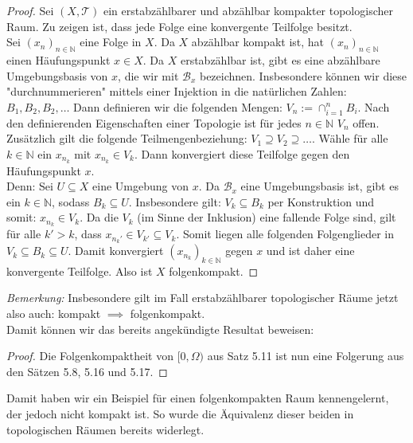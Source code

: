 \documentclass[11pt]{scrartcl}
\begin{document}
\begin{proof}
	Sei $(X,\mathcal T)$ ein erstabzählbarer und abzählbar kompakter topologischer Raum. Zu zeigen ist, dass jede Folge
	eine konvergente Teilfolge besitzt.\\
	Sei $(x_n)_{n\in\mathbb N}$ eine Folge in $X$. Da $X$ abzählbar kompakt ist, hat $(x_n)_{n\in\mathbb N}$ einen
	Häufungspunkt $x\in X$. Da $X$ erstabzählbar ist, gibt es eine abzählbare Umgebungsbasis von $x$, die wir mit $\mathcal B_x$ bezeichnen. Insbesondere
	können wir diese "durchnummerieren" mittels einer Injektion in die natürlichen Zahlen: $B_1,B_2,B_2,\dots$ Dann definieren wir die
	folgenden Mengen: $V_n:= \cap_{i=1}^n B_i$. Nach den definierenden Eigenschaften einer Topologie ist für jedes $n\in\mathbb N$ 
	$V_n$ offen. Zusätzlich gilt die folgende Teilmengenbeziehung: $V_1 \supseteq V_2 \supseteq \dots$. Wähle für alle $k\in\mathbb N$ ein $x_{n_k}$
	mit $x_{n_k}\in V_k$. Dann konvergiert diese Teilfolge gegen den Häufungspunkt $x$.\\
	Denn: Sei $U \subseteq X$ eine Umgebung von $x$. Da $\mathcal B_x$ eine Umgebungsbasis ist, gibt es ein $k\in\mathbb N$, sodass $ B_k \subseteq U$. 
	Insbesondere gilt: $ V_k \subseteq B_k$ per Konstruktion und somit: $x_{n_k}\in V_k$. Da die $V_k$ (im Sinne der Inklusion) eine fallende Folge
        sind, gilt für alle $k'>k$, dass $x_{n_k'}\in V_{k'} \subseteq V_k$. Somit liegen alle folgenden Folgenglieder in $V_k \subseteq B_k \subseteq U$.
	Damit konvergiert $(x_{n_k})_{k\in\mathbb N}$ gegen $x$ und ist daher eine konvergente Teilfolge. Also ist $X$ folgenkompakt.
\end{proof}
\textit{Bemerkung:} Insbesondere gilt im Fall erstabzählbarer topologischer Räume jetzt also auch: kompakt $\implies$ folgenkompakt.\\
Damit können wir das bereits angekündigte Resultat beweisen:
\begin{proof}
	Die Folgenkompaktheit von $[0, \Omega)$ aus Satz 5.11 ist nun eine Folgerung aus den Sätzen
	5.8, 5.16 und 5.17.
\end{proof}
\noindent Damit haben wir ein Beispiel für einen folgenkompakten Raum kennengelernt, der jedoch nicht kompakt ist.
So wurde die Äquivalenz dieser beiden in topologischen Räumen bereits widerlegt.
\end{document}
